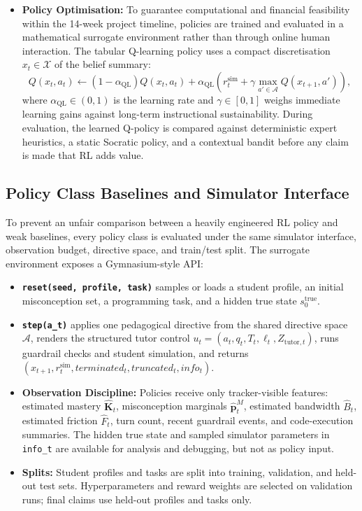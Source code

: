 \documentclass[11pt,a4paper]{report}
\begin{document}
\begin{itemize}
    \item \textbf{Policy Optimisation:} To guarantee computational and financial feasibility within the 14-week project timeline, policies are trained and evaluated in a mathematical surrogate environment rather than through online human interaction. The tabular Q-learning policy uses a compact discretisation $x_t \in \mathcal{X}$ of the belief summary:
    \begin{equation}
        Q(x_t,a_t) \gets (1-\alpha_{\text{QL}})Q(x_t,a_t)
        + \alpha_{\text{QL}}
        \left(r_t^{\text{sim}} + \gamma \max_{a' \in \mathcal{A}} Q(x_{t+1},a')\right),
    \end{equation}
    where $\alpha_{\text{QL}}\in(0,1)$ is the learning rate and $\gamma\in[0,1]$ weighs immediate learning gains against long-term instructional sustainability. During evaluation, the learned Q-policy is compared against deterministic expert heuristics, a static Socratic policy, and a contextual bandit before any claim is made that RL adds value.
\end{itemize}

\subsection{Policy Class Baselines and Simulator Interface}
To prevent an unfair comparison between a heavily engineered RL policy and weak baselines, every policy class is evaluated under the same simulator interface, observation budget, directive space, and train/test split. The surrogate environment exposes a Gymnasium-style API:
\begin{itemize}
    \item \textbf{\texttt{reset(seed, profile, task)}} samples or loads a student profile, an initial misconception set, a programming task, and a hidden true state $s_0^{\text{true}}$.
    \item \textbf{\texttt{step(a\_t)}} applies one pedagogical directive from the shared directive space $\mathcal{A}$, renders the structured tutor control $u_t=(a_t,q_t,T_t,\ell_t,Z_{\text{tutor},t})$, runs guardrail checks and student simulation, and returns $(x_{t+1}, r_t^{\text{sim}}, terminated_t, truncated_t, info_t)$.
    \item \textbf{Observation Discipline:} Policies receive only tracker-visible features: estimated mastery $\hat{\mathbf{K}}_t$, misconception marginals $\hat{\mathbf{p}}^M_t$, estimated bandwidth $\hat{B}_t$, estimated friction $\hat{F}_t$, turn count, recent guardrail events, and code-execution summaries. The hidden true state and sampled simulator parameters in \texttt{info\_t} are available for analysis and debugging, but not as policy input.
    \item \textbf{Splits:} Student profiles and tasks are split into training, validation, and held-out test sets. Hyperparameters and reward weights are selected on validation runs; final claims use held-out profiles and tasks only.
\end{itemize}
\end{document}
